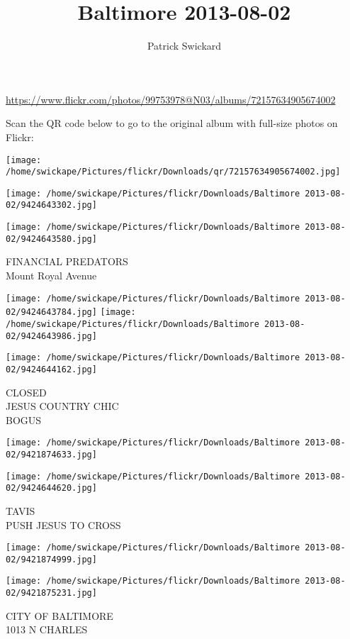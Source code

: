 \documentclass[10pt,letterpaper]{article}
\title{Baltimore 2013-08-02}
\author{Patrick Swickard}
\date{}
\begin{document}
\maketitle

\url{https://www.flickr.com/photos/99753978@N03/albums/72157634905674002}

Scan the QR code below to go to the original album with full-size photos on Flickr:

\texttt{[image: /home/swickape/Pictures/flickr/Downloads/qr/72157634905674002.jpg]}
\pagebreak

\texttt{[image: /home/swickape/Pictures/flickr/Downloads/Baltimore 2013-08-02/9424643302.jpg]}

\vspace{0.25in}
\texttt{[image: /home/swickape/Pictures/flickr/Downloads/Baltimore 2013-08-02/9424643580.jpg]}

FINANCIAL PREDATORS\\
Mount Royal Avenue
\pagebreak

\texttt{[image: /home/swickape/Pictures/flickr/Downloads/Baltimore 2013-08-02/9424643784.jpg]}
\texttt{[image: /home/swickape/Pictures/flickr/Downloads/Baltimore 2013-08-02/9424643986.jpg]}

\vspace{0.25in}
\texttt{[image: /home/swickape/Pictures/flickr/Downloads/Baltimore 2013-08-02/9424644162.jpg]}

CLOSED\\
JESUS COUNTRY CHIC\\
BOGUS
\pagebreak

\texttt{[image: /home/swickape/Pictures/flickr/Downloads/Baltimore 2013-08-02/9421874633.jpg]}

\vspace{0.25in}
\texttt{[image: /home/swickape/Pictures/flickr/Downloads/Baltimore 2013-08-02/9424644620.jpg]}

TAVIS\\
PUSH JESUS TO CROSS
\pagebreak

\texttt{[image: /home/swickape/Pictures/flickr/Downloads/Baltimore 2013-08-02/9421874999.jpg]}

\vspace{0.25in}
\texttt{[image: /home/swickape/Pictures/flickr/Downloads/Baltimore 2013-08-02/9421875231.jpg]}

CITY OF BALTIMORE\\
1013 N CHARLES
\pagebreak
\end{document}
